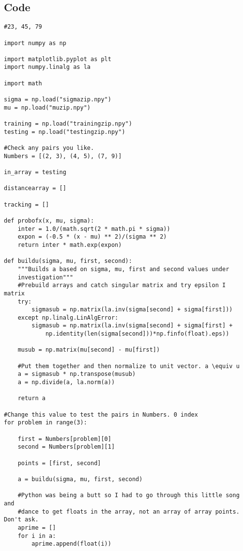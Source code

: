 \documentclass[paper=a4, fontsize=11pt]{scrartcl} %
\numberwithin{equation}{section} %
\numberwithin{figure}{section} %
\numberwithin{table}{section} %
\theoremstyle{statement}
\begin{document}
\subsection{Code}
\begin{verbatim}
#23, 45, 79

import numpy as np

import matplotlib.pyplot as plt
import numpy.linalg as la

import math

sigma = np.load("sigmazip.npy")
mu = np.load("muzip.npy")

training = np.load("trainingzip.npy")
testing = np.load("testingzip.npy")

#Check any pairs you like.
Numbers = [(2, 3), (4, 5), (7, 9)]

in_array = testing

distancearray = []

tracking = []

def probofx(x, mu, sigma):
    inter = 1.0/(math.sqrt(2 * math.pi * sigma))
    expon = (-0.5 * (x - mu) ** 2)/(sigma ** 2)
    return inter * math.exp(expon)

def buildu(sigma, mu, first, second):
    """Builds a based on sigma, mu, first and second values under 
    investigation"""
    #Prebuild arrays and catch singular matrix and try epsilon I matrix
    try:
        sigmasub = np.matrix(la.inv(sigma[second] + sigma[first]))
    except np.linalg.LinAlgError:
        sigmasub = np.matrix(la.inv(sigma[second] + sigma[first] + 
            np.identity(len(sigma[second]))*np.finfo(float).eps))
    
    musub = np.matrix(mu[second] - mu[first])
    
    #Put them together and then normalize to unit vector. a \equiv u
    a = sigmasub * np.transpose(musub)    
    a = np.divide(a, la.norm(a))
    
    return a

#Change this value to test the pairs in Numbers. 0 index
for problem in range(3):

    first = Numbers[problem][0]
    second = Numbers[problem][1]
    
    points = [first, second]
            
    a = buildu(sigma, mu, first, second)
    
    #Python was being a butt so I had to go through this little song and 
    #dance to get floats in the array, not an array of array points. Don't ask.
    aprime = []
    for i in a:
        aprime.append(float(i))
    

\end{verbatim}
\end{document}
